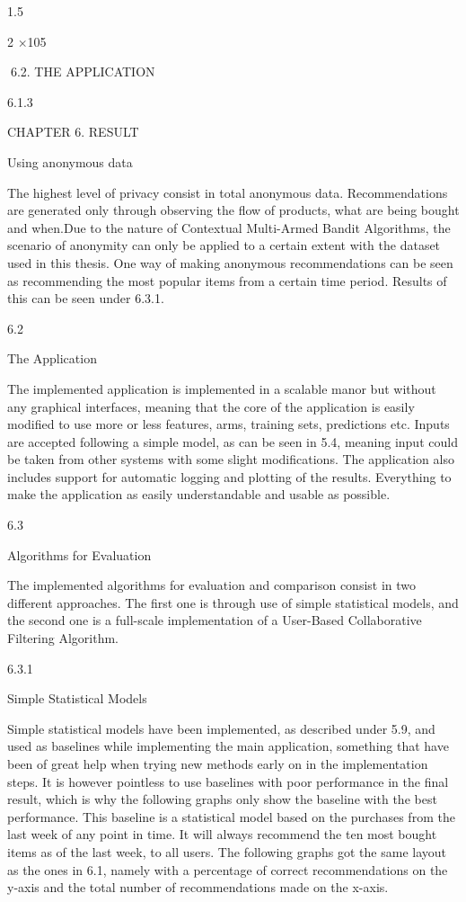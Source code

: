 1.5

2
×105

6.2. THE APPLICATION

6.1.3

CHAPTER 6. RESULT

Using anonymous data

The highest level of privacy consist in total anonymous data. Recommendations are
generated only through observing the flow of products, what are being bought and
when.Due to the nature of Contextual Multi-Armed Bandit Algorithms, the scenario of
anonymity can only be applied to a certain extent with the dataset used in this thesis.
One way of making anonymous recommendations can be seen as recommending the most
popular items from a certain time period. Results of this can be seen under 6.3.1.

6.2

The Application

The implemented application is implemented in a scalable manor but without any graphical interfaces, meaning that the core of the application is easily modified to use more or
less features, arms, training sets, predictions etc. Inputs are accepted following a simple
model, as can be seen in 5.4, meaning input could be taken from other systems with
some slight modifications. The application also includes support for automatic logging
and plotting of the results. Everything to make the application as easily understandable
and usable as possible.

6.3

Algorithms for Evaluation

The implemented algorithms for evaluation and comparison consist in two different approaches. The first one is through use of simple statistical models, and the second one
is a full-scale implementation of a User-Based Collaborative Filtering Algorithm.

6.3.1

Simple Statistical Models

Simple statistical models have been implemented, as described under 5.9, and used as
baselines while implementing the main application, something that have been of great
help when trying new methods early on in the implementation steps. It is however
pointless to use baselines with poor performance in the final result, which is why the
following graphs only show the baseline with the best performance. This baseline is a
statistical model based on the purchases from the last week of any point in time. It
will always recommend the ten most bought items as of the last week, to all users. The
following graphs got the same layout as the ones in 6.1, namely with a percentage of
correct recommendations on the y-axis and the total number of recommendations made
on the x-axis.

